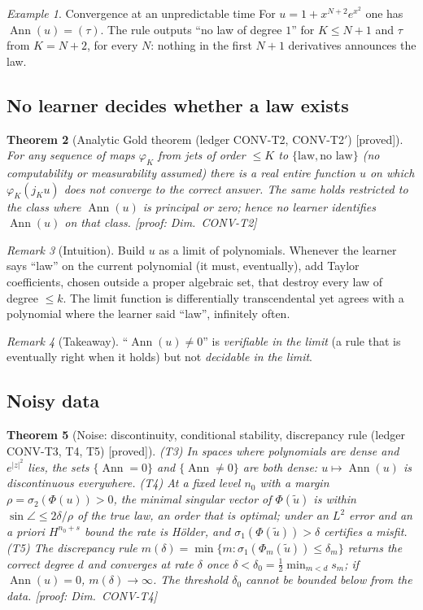 \documentclass[11pt]{article}
\theoremstyle{plain}
\newtheorem{theorem}{Theorem}[section]
\theoremstyle{definition}
\theoremstyle{remark}
\newtheorem{remark}[theorem]{Remark}
\newtheorem{example}[theorem]{Example}
\DeclareMathOperator{\Ann}{Ann}             %
\newcommand{\badge}[2]{\textcolor{#1}{\textsf{\footnotesize[#2]}}}
\newcommand{\proved}[1][]{\badge{cC}{proved#1}}
\newcommand{\led}[1]{\textcolor{cG}{\textsf{\footnotesize(ledger #1)}}}
\newenvironment{intuition}{\begin{remark}[Intuition]}{\end{remark}}
\newenvironment{keypoint}{\begin{remark}[Takeaway]}{\end{remark}}
\newcommand{\dimref}[1]{\textsf{\footnotesize[proof: Dim.~#1]}}
\begin{document}
\begin{example}{Convergence at an unpredictable time}
For $u=1+x^{N+2}e^{x^2}$ one has $\Ann(u)=(\tau)$. The rule outputs ``no law of degree $1$'' for $K\le N+1$ and $\tau$ from $K=N+2$, for every $N$: nothing in the first $N+1$ derivatives announces the law.
\end{example}

\subsection{No learner decides whether a law exists}

\begin{theorem}[{Analytic Gold theorem \led{CONV-T2, CONV-T2$'$} \proved}]\label{thm:convt2}
For any sequence of maps $\varphi_K$ from jets of order $\le K$ to $\{\text{law},\text{no law}\}$ (no computability or measurability assumed) there is a real entire function $u$ on which $\varphi_K(j_Ku)$ does not converge to the correct answer. The same holds restricted to the class where $\Ann(u)$ is principal or zero; hence no learner identifies $\Ann(u)$ on that class.
\dimref{CONV-T2}
\end{theorem}

\begin{intuition}
Build $u$ as a limit of polynomials. Whenever the learner says ``law'' on the current polynomial (it must, eventually), add Taylor coefficients, chosen outside a proper algebraic set, that destroy every law of degree $\le k$. The limit function is differentially transcendental yet agrees with a polynomial where the learner said ``law'', infinitely often.
\end{intuition}

\begin{keypoint}
``$\Ann(u)\ne0$'' is \emph{verifiable in the limit} (a rule that is eventually right when it holds) but not \emph{decidable in the limit}.
\end{keypoint}

\subsection{Noisy data}

\begin{theorem}[{Noise: discontinuity, conditional stability, discrepancy rule \led{CONV-T3, T4, T5} \proved}]\label{thm:convt45}
(T3) In spaces where polynomials are dense and $e^{|z|^2}$ lies, the sets $\{\Ann=0\}$ and $\{\Ann\ne0\}$ are both dense: $u\mapsto\Ann(u)$ is discontinuous everywhere. (T4) At a fixed level $n_0$ with a margin $\rho=\sigma_2(\Phi(u))>0$, the minimal singular vector of $\Phi(\tilde u)$ is within $\sin\angle\le2\delta/\rho$ of the true law, an order that is optimal; under an $L^2$ error and an a priori $H^{n_0+s}$ bound the rate is H\"older, and $\sigma_1(\Phi(\tilde u))>\delta$ certifies a misfit. (T5) The discrepancy rule $m(\delta)=\min\{m:\sigma_1(\Phi_m(\tilde u))\le\delta_m\}$ returns the correct degree $d$ and converges at rate $\delta$ once $\delta<\delta_0=\tfrac12\min_{m<d}s_m$; if $\Ann(u)=0$, $m(\delta)\to\infty$. The threshold $\delta_0$ cannot be bounded below from the data.
\dimref{CONV-T4}
\end{theorem}
\end{document}
